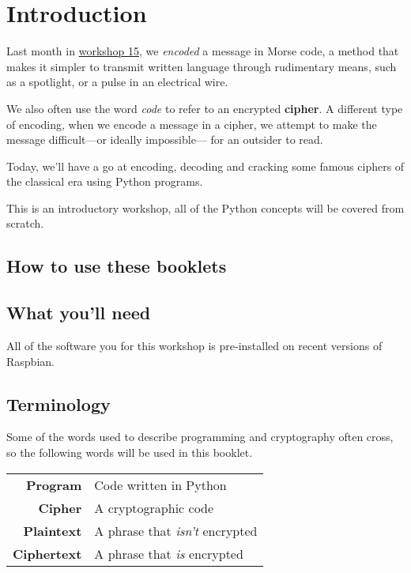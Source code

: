 \setcounter{section}{-1}
\section{Introduction}

	Last month in \href{http://mcrraspjam.org.uk/workshop-15-gpio-zero/}{workshop 15}, we \textit{encoded} a message in Morse code, a method that makes it simpler to transmit written language through rudimentary means, such as a spotlight, or a pulse in an electrical wire.
	
	We also often use the word \textit{code} to refer to an encrypted \textbf{cipher}. A different type of encoding, when we encode a message in a cipher, we attempt to make the message difficult---or ideally impossible--- for an outsider to read.
	
	Today, we'll have a go at encoding, decoding and cracking some famous ciphers of the classical era using Python programs. %
	
	
	This is an introductory workshop, all of the Python concepts will be covered from scratch.
		
	\subsection*{How to use these booklets}

	
	
	
	
	
	\ifprint\else
		\subsection*{What you'll need}
		All of the software you for this workshop is pre-installed on recent versions of Raspbian.
	\fi
	
	\subsection*{Terminology}
	
		Some of the words used to describe programming and cryptography often cross, so the following words will be used in this booklet.
		
		\begin{tabular}{rl}
			\textbf{Program} & Code written in Python \\
			\textbf{Cipher} & A cryptographic code \\
			\textbf{Plaintext} & A phrase that \textit{isn't} encrypted \\ 
			\textbf{Ciphertext} & A phrase that \textit{is} encrypted
		\end{tabular} 
	
